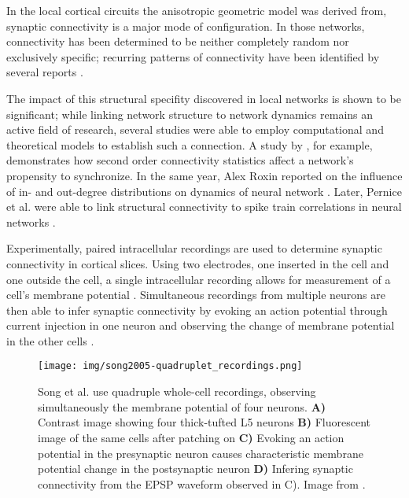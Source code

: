 In the local cortical circuits the anisotropic geometric model was
 derived from, synaptic connectivity
is a major mode of configuration.  In those networks, connectivity has
been determined to be neither completely random nor exclusively
specific; recurring patterns of connectivity have been identified by
several reports \parencite{Sporns2004,Song2005,Perin2011}.

The impact of this structural specifity discovered in local networks
is shown to be significant; while linking network structure to network
dynamics remains an active field of research, several studies were
able to employ computational and theoretical models to establish such
a connection. A study by \textcite{Zhao2011}, for example,
demonstrates how second order connectivity statistics affect a
network's propensity to synchronize. In the same year, Alex Roxin
reported on the influence of in- and out-degree distributions on
dynamics of neural network \parencite{Roxin2011}. Later,
Pernice et al. were able to link structural connectivity to spike
train correlations in neural networks
\parencite{Pernice2011}.

Experimentally, paired intracellular recordings are used to
 determine
synaptic connectivity in cortical slices. Using two electrodes, one
inserted in the cell and one outside the cell, a single intracellular
recording allows for measurement of a cell's membrane potential
\parencites[Chapter 3]{Brette_Neural-activity}[]{Scholarpedia-IntracellularRecording}. Simultaneous
recordings from multiple neurons are then able to infer synaptic
connectivity by evoking an action potential through current injection
in one neuron and observing the change of membrane potential in the
other cells \parencite{Song2005}.

\begin{figure}[H]
  \centering
  \texttt{[image: img/song2005-quadruplet\_recordings.png]}
  \caption{Song et al. use quadruple whole-cell recordings, observing
    simultaneously the membrane potential of four neurons.
    \textbf{A)} Contrast image showing four thick-tufted L5 neurons
    \textbf{B)} Fluorescent image of the same cells after patching on
    \textbf{C)} Evoking an action potential in the presynaptic neuron
    causes characteristic membrane potential change in the
    postsynaptic neuron \textbf{D)} Infering synaptic connectivity
    from the EPSP waveform observed in C). Image from \textcite{Song2005}.
  }
\end{figure}

